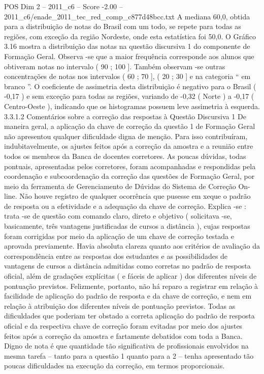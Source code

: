 \begin{textsample}{POS Dim 2 – 2011\_c6 – Score -2.00 – 2011\_c6/enade\_2011\_tec\_red\_comp\_c877d48bcc.txt}
A mediana 60,0, obtida para a distribuição de notas do Brasil com um todo, se repete para todas as regiões, com exceção da região Nordeste, onde esta estatística foi 50,0.
O Gráfico 3.16 mostra a distribuição das notas na questão discursiva 1 do componente de Formação Geral.
Observa -se que a maior frequência corresponde aos alunos que obtiveram notas no intervalo ( 90 ; 100 ].
Também observam -se outras concentrações de notas nos intervalos ( 60 ; 70 ], ( 20 ; 30 ] e na categoria “ em branco ”.
O coeficiente de assimetria desta distribuição é negativo para o Brasil ( -0,17 ) e sem exceção para todas as regiões, variando de -0,32 ( Norte ) a -0,17 ( Centro-Oeste ), indicando que os histogramas possuem leve assimetria à esquerda. 3.3.1.2 Comentários sobre a correção das respostas à Questão Discursiva 1 De maneira geral, a aplicação da chave de correção da questão 1 de Formação Geral não apresentou qualquer dificuldade digna de menção.
Para isso contribuíram, indubitavelmente, os ajustes feitos após a correção da amostra e a reunião entre todos os membros da Banca de docentes corretores.
As poucas dúvidas, todas pontuais, apresentadas pelos corretores, foram acompanhadas e respondidas pela coordenação e subcoordenação da correção das questões de Formação Geral, por meio da ferramenta de Gerenciamento de Dúvidas do Sistema de Correção On-line.
Não houve registro de qualquer ocorrência que pusesse em xeque o padrão de resposta ou a efetividade e a adequação da chave de correção.
Explica -se : trata -se de questão com comando claro, direto e objetivo ( solicitava -se, basicamente, três vantagens justificadas de cursos a distância ), cujas respostas foram corrigidas por meio da aplicação de um chave de correção testada e aprovada previamente.
Havia absoluta clareza quanto aos critérios de avaliação da correspondência entre as respostas dos estudantes e as possibilidades de vantagens de cursos a distância admitidas como corretas no padrão de resposta oficial, além de gradações explícitas ( e fáceis de aplicar ) dos diferentes níveis de pontuação previstos.
Felizmente, portanto, não há reparo a registrar em relação à facilidade de aplicação do padrão de resposta e da chave de correção, e nem em relação à atribuição dos diferentes níveis de pontuação previstos.
Todas as dificuldades que poderiam ter obstado a correta aplicação do padrão de resposta oficial e da respectiva chave de correção foram evitadas por meio dos ajustes feitos após a correção da amostra e fartamente debatidos com toda a Banca.
Digno de nota é que quantidade tão significativa de profissionais envolvidos na mesma tarefa – tanto para a questão 1 quanto para a 2 – tenha apresentado tão poucas dificuldades na execução da correção, em termos proporcionais.

\end{textsample}
